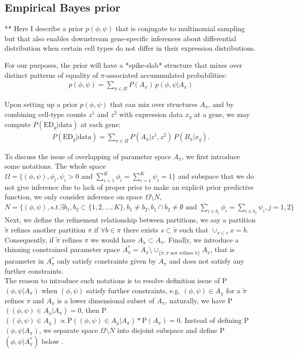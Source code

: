 \documentclass[11pt]{amsart}
\begin{document}
\subsection{Empirical Bayes prior}

**
Here I describe a prior $p(\phi,\psi)$ that is conjugate to multinomial
sampling but that also enables downstream gene-specific inferences about
differential distribution when certain 
cell types do not differ in their expression
distributions.  


For our purposes, the prior will have a *spike-slab* structure that mixes
over distinct patterns of equality of $\pi$-associated
accummulated probabilities:
\begin{eqnarray*}
p(\phi,\psi) = \sum_{\pi \in \Pi} P(A_\pi) \, p(\phi,\psi| A_\pi )
\end{eqnarray*}


Upon setting up a prior $p(\phi,\psi)$ that can mix over structures
$A_\pi$, and by combining cell-type counts $z^1$ and $z^2$ with
expression data $x_g$ at a gene, we may compute 
$P(\text{ED}_g|\text{data})$ 
at each gene:
\begin{eqnarray*}
P(\text{ED}_g|\text{data}) = \sum_{\pi \in \Pi} P(A_\pi|z^1, z^2) \, 
P(B_\pi|x_g).
\end{eqnarray*}

To discuss the issue of overlapping of parameter space $A_\pi$, we first introduce some notations. The whole space $\Omega = \{ (\phi,\psi), \phi_i,\psi_i > 0 \text{ and } \sum_{i=1}^K \phi_i = \sum_{i=1}^K \psi_i = 1\}$ and subspace that we do not give inference due to lack of proper prior to make an explicit prior predictive function, we only consider inference on space $\Omega \setminus N$, $N = \{ (\phi,\psi), s.t. \exists b_1, b_2 \subset \{1,2, ... , K \}, b_1 \neq b_2, b_1 \cap b_2 \neq  \emptyset \text{ and } \sum_{i\in b_j} \phi_i = \sum_{i\in b_j} \psi_i, j = 1, 2 \}$\\ 
Next, we define the refinement relationship between partitions, we say a partition $\tilde{\pi}$ refines another partition $\pi$ if $\forall b \in \pi$ there exists $s \subset \tilde{\pi}$  such that $\cup_{x\in s} x = b$. Consequently, if $\tilde{\pi} \text{ refines } \pi$ we would have $A_{\tilde{\pi}} \subset A_\pi$.  Finally, we introduce a thinning constrained parameter space $A_\pi^* = A_\pi \setminus \cup_{\{\tilde{\pi}, \pi \text{ not refines } \tilde{\pi} \}} A_{\tilde{\pi}}$, that is parameter in $A_\pi^*$ only satisfy constraints given by $A_\pi$ and does not satisfy any further constraints.\\
The reason to introduce such notations is to resolve definition issue of P$(\phi,\psi| A_\pi )$ when $(\phi, \psi)$ satisfy further constraints, e.g. $(\phi,\psi) \in A_{\tilde{\pi}}$ for a $\tilde{\pi}$ refines $\pi$ and $A_{\tilde{\pi}}$ is a lower dimensional subset of $A_\pi$, naturally, we have P$((\phi,\psi) \in A_{\tilde{\pi}} | A_\pi ) = 0$, then P$((\phi,\psi) \in A_{\tilde{\pi}}) \propto  \text{P}( (\phi,\psi) \in A_{\tilde{\pi}}| A_\pi ) *  \text{P}(A_\pi) = 0$. Instead of defining P$(\phi,\psi| A_\pi )$, we separate space $\Omega \setminus N$ into disjoint subspace and define P$(\phi,\psi| A_\pi^* )$ below .
\end{document}
